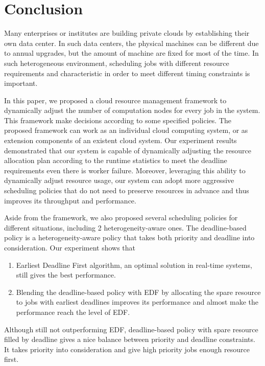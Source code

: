 \chapter{Conclusion}\label{chap:conclusion}

Many enterprises or institutes are building private clouds by
establishing their own data center.
In such data centers, the physical machines can be different due to 
annual upgrades,  but the amount of machine are fixed for most of the 
time.
In such heterogeneous environment, scheduling jobs with different 
resource requirements and characteristic in order to meet different 
timing constraints is important.

In this paper, we proposed a cloud resource management framework to
dynamically adjust the number of computation nodes for every job in the
system.
This framework make decisions according to some specified policies.
The proposed framework can work as an individual cloud computing system,
or as extension components of an existent cloud system.
Our experiment results demonstrated that our system is capable of
dynamically adjusting the resource allocation plan according to the
runtime statistics to meet the deadline requirements even there is
worker failure.
Moreover, leveraging this ability to dynamically adjust resource usage,
our system can adopt more aggressive scheduling policies that do not
need to preserve resources in advance and thus improves its throughput
and performance.

Aside from the framework, we also proposed several scheduling policies
for different situations, including 2 heterogeneity-aware ones.
The deadline-based policy is a heterogeneity-aware policy that takes
both priority and deadline into consideration.
Our experiment shows that
\begin{enumerate}
  \item Earliest Deadline First algorithm, an optimal solution in
    real-time systems, still gives the best performance.
  \item Blending the deadline-based policy with EDF by allocating the
    spare resource to jobs with earliest deadlines improves its
    performance and almost make the performance reach the level of EDF.
\end{enumerate}
Although still not outperforming EDF, deadline-based policy with spare
resource filled by deadline gives a nice balance between priority and
deadline constraints.
It takes priority into consideration and give high priority jobs enough
resource first.
